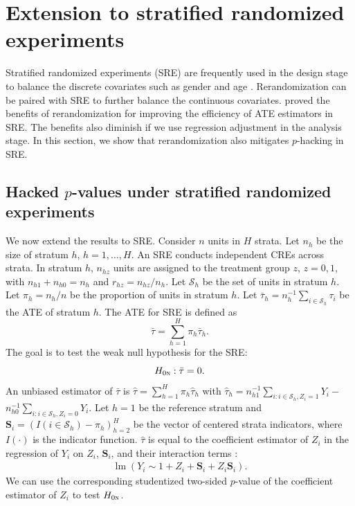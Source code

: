 \documentclass[12pt]{article}
\newcommand{\lmm}{\operatorname{lm}}
\newcommand{\ms}{\mathcal{S}}
\newcommand{\bs}{\boldsymbol}
\begin{document}
\section{Extension to stratified randomized experiments}

Stratified randomized experiments (SRE) are frequently used in the design stage to balance the discrete covariates such as gender and age \citep{imbens2015causal,ding2024first}. Rerandomization can be paired with SRE to further balance the continuous covariates. \citet{wang2021rerandomization} proved the benefits of rerandomization for improving the efficiency of ATE estimators in SRE. The benefits also diminish if we use regression adjustment in the analysis stage. In this section, we show that rerandomization also mitigates $p$-hacking in SRE.

\label{sec:stratified-CRE}
\subsection{Hacked $p$-values under stratified randomized experiments}
We now extend the results to SRE. Consider $n$ units in $H$ strata. Let $n_{ h }$ be the size of stratum $h$, $h=1,\ldots,H$. An SRE conducts independent CREs across strata. In stratum $h$, $n_{ h z}$ units are assigned to the treatment group $z$, $z=0,1$, with $n_{ h 1}+n_{ h 0} = n_{ h }$ and $r_{ h z} = n_{ h z}/n_{ h }$. Let $\ms_{ h } $ be the set of units in stratum $h$. Let $\pi_{ h } = n_{ h }/n$ be the proportion of units in stratum $h$. Let $\bar{\tau}_{ h } = n_{ h }^{-1}\sum_{i\in  \ms_{ h } }\tau_i$ be the ATE of stratum $h$. The ATE for SRE is defined as $$\bar{\tau} = \sum_{h=1}^H \pi_{ h }\bar{\tau}_{ h }.$$  The goal is to test the weak null hypothesis for the SRE: $$H_{0\textsc{n}}: \bar{\tau} = 0.$$ An unbiased estimator of $\bar{\tau}$  is $\hat{\tau} = \sum_{h=1}^H \pi_{ h }\hat{\tau}_{ h }$ with $\hat{\tau}_{ h } = n_{h1}^{-1}\sum_{i:i\in \ms_h,Z_i=1} Y_i - $ $ n_{h0}^{-1}\sum_{i:i\in \ms_h,Z_i=0} Y_i$. Let $h=1$ be the reference stratum and $\bs{S}_{i} = (I(i\in \ms_{ h })-\pi_{ h })_{h=2}^H$  be the vector of centered strata indicators, where $I(\cdot)$ is the indicator function. $\hat{\tau}$ is equal to the coefficient estimator of $Z_i$ in the regression of $Y_i$ on $Z_i$, $\bs{S}_i$, and their interaction terms \citep{Lin2013Agnostic,miratrix2013adjusting,liu2020regression}:
\begin{align}
\label{eq:formul-stra}
    \lmm(Y_i \sim 1+ Z_i+\bs{S}_i + Z_i \bs{S}_i).
\end{align}
We can use the corresponding studentized two-sided $p$-value of the coefficient estimator of $Z_i$ to test $H_{0\textsc{n}}$.
\end{document}
